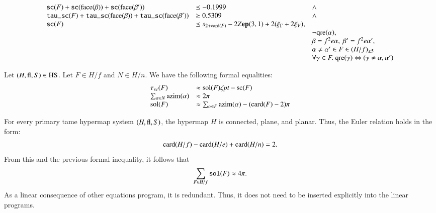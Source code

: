 \begin{equation}
    \begin{array}{lllll}
    {\operatorname{{\texttt{sc}}}}(F) + {\operatorname{{\texttt{sc}}}}({\operatorname{face}}(\beta)) +
    {\operatorname{{\texttt{sc}}}}({\operatorname{face}}(\beta')) &\preceq -0.1999&\wedge \\
    {\operatorname{{\texttt{tau\_sc}}}}(F) + {\operatorname{{\texttt{tau\_sc}}}}({\operatorname{face}}(\beta)) +
    {\operatorname{{\texttt{tau\_sc}}}}({\operatorname{face}}(\beta')) &\succeq 0.5309 &\wedge \\
    {\operatorname{{\texttt{sc}}}}(F) & \preceq s_{2+{\operatorname{card}}(F)} - 2 Z{\operatorname{\bf ep}}{(3,1)} + 2(\xi_\Gamma + 2\xi_V), \\
    &&\neg{\operatorname{qre}}(\alpha),\\
    &&\beta=f^2e\alpha,\ \beta'=f^2e\alpha',\\
    &&\alpha\ne\alpha'\in F\in (H/f)_{\ge5}\\
    &&\forall\gamma\in F.\ {\operatorname{qre}}(\gamma)\Leftrightarrow (\gamma\ne\alpha,\alpha')\\
    \end{array}
\end{equation}



Let $(H,{\operatorname{fl}},S)\in{\operatorname{HS}}$.   Let $F\in H/f$ and $N\in H/n$. We
have the following formal equalities:
\begin{equation}
    \begin{array}{lll}
    \tau_{sc}(F) &\approx \operatorname{sol}(F)\zeta\hbox{\it pt} - {\operatorname{sc}}(F)\\
    \sum_{\alpha\in N}{\operatorname{azim}}(\alpha) &\approx
    2\pi\\
    {\operatorname{sol}}(F) &\approx \sum_{\alpha\in F}{\operatorname{azim}}(\alpha) - ({\operatorname{card}}(F)
    - 2)\pi\\
    \end{array}
    \label{eqn:tau-sc}
\end{equation}


\begin{remark}  For every  primary tame hypermap system $(H,{\operatorname{fl}},S)$, the
hypermap $H$ is connected, plane, and planar.  Thus, the Euler
relation holds in the form:
    $$
    {\operatorname{card}}(H/f) - {\operatorname{card}}(H/e) + {\operatorname{card}}(H/n) = 2.
    $$
From this and the previous formal inequality, it follows that
    \begin{equation}
    \sum_{F\in H/f} {\operatorname{{\texttt{sol}}}}(F) \approx 4\pi.
    \end{equation}
As a linear consequence of other equations program, it is
redundant.  Thus, it does not need to be inserted explicitly into
the linear programs.
\end{remark}



